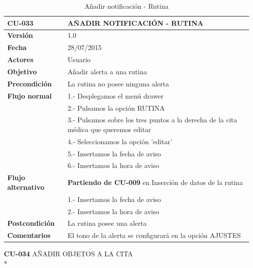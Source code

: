 \documentclass[../pfc.tex]{subfiles}
\begin{document}
	\begin{table}[H]
		\centering
		\begin{tabular}[t]{|p{3cm}|p{9.5cm}|}
			\hline \textbf{CU-033} & \textbf{AÑADIR NOTIFICACIÓN - RUTINA} \\*
			\hline\hline \textbf{Versión} & 1.0 \\*
			\hline\hline \textbf{Fecha} & 28/07/2015 \\*
			\hline\textbf{Actores} 	& Usuario\\*
			\hline \textbf{Objetivo} & Añadir alerta a una rutina\\* 			
			\hline \textbf{Precondición} & La rutina no posee ninguna alerta\\* 
			\hline \textbf{Flujo normal} & 1.- Desplegamos el menú drawer \\* 
			& 2.- Pulsamos la opción RUTINA\\*	
			& 3.- Pulsamos sobre los tres puntos a la derecha de la cita médica que queremos editar\\*	
			& 4.- Seleccionamos la opción 'editar'\\*	
			& 5.- Insertamos la fecha de aviso\\*
			& 6.- Insertamos la hora de aviso\\*
			\hline \textbf{Flujo alternativo} & \textbf{Partiendo de CU-009} en Inserción de datos de la rutina\\*  
			& 1.- Insertamos la fecha de aviso\\*
			& 2.- Insertamos la hora de aviso\\*
			\hline \textbf{Postcondición} & La rutina posee una alerta\\* 
			\hline \textbf{Comentarios}   & El tono de la alerta se configurará en la opción AJUSTES\\*
			\hline
		\end{tabular}
		\caption{Añadir notificación - Rutina}
		\label{tabla:caso033}
	\end{table}		

	\clearpage	

	\textbf{CU-034}	AÑADIR OBJETOS A LA CITA\\*
\end{document}
